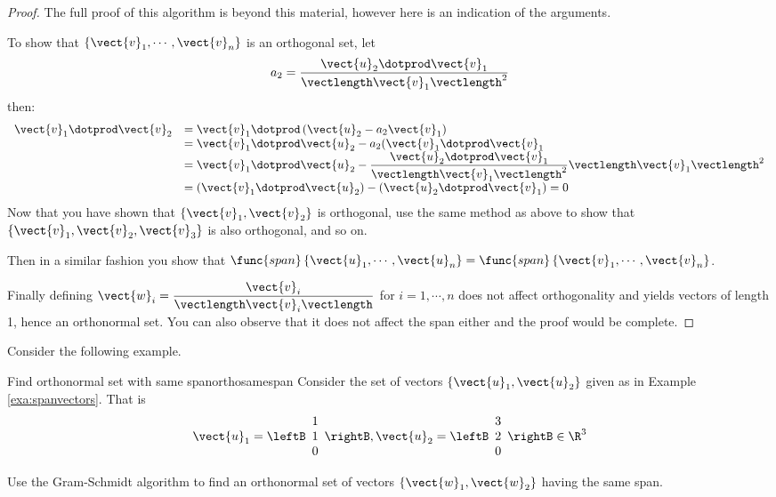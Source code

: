 \begin{proof}
The full proof of this algorithm is beyond this material, however here is an indication of the arguments. 

To show that  $\left\{ \vect{v}_1,\cdots , \vect{v}_n  \right\} $ is an orthogonal set, let 
\[ a_2 =  \dfrac{ \vect{u}_2 \dotprod \vect{v}_1}{\vectlength \vect{v}_1 \vectlength^2} \]
then: 
\[
\begin{array}{ll}
 \vect{v}_1 \dotprod \vect{v}_2 &  =  \vect{v}_1 \dotprod \left( \vect{u}_2 - a_2 \vect{v}_1 \right)  \\
 & = \vect{v}_1 \dotprod \vect{u}_2 - a_2 (\vect{v}_1 \dotprod \vect{v}_1  \\
 & = \vect{v}_1 \dotprod \vect{u}_2 - \dfrac{ \vect{u}_2 \dotprod \vect{v}_1}{\vectlength \vect{v}_1 \vectlength^2} \vectlength \vect{v}_1 \vectlength^2 \\
 & = ( \vect{v}_1 \dotprod \vect{u}_2 ) - ( \vect{u}_2 \dotprod \vect{v}_1 ) =0\\
\end{array}
\]
Now that you have shown that $\{ \vect{v}_1, \vect{v}_2\}$ is orthogonal,  use the same method as above to show that 
$\{ \vect{v}_1, \vect{v}_2, \vect{v}_3\}$ is also orthogonal,  and so on. 

Then in a similar fashion you show that $\func{span}\left\{
\vect{u}_1,\cdots ,\vect{u}_n \right\} = \func{span}\left\{
\vect{v}_1,\cdots ,\vect{v}_n \right\}$.

Finally defining $\vect{w}_i =
\dfrac{\vect{v}_i}{\vectlength\vect{v}_i\vectlength}$ for $i=1, \cdots
,n$ does not affect orthogonality and yields vectors of length 1,
hence an orthonormal set. You can also observe that it does not affect
the span either and the proof would be complete.
\end{proof}

Consider the following example.

\begin{example}{Find orthonormal set with same span}{orthosamespan}
Consider the set of vectors $\{\vect{u}_1, \vect{u}_2\}$ given as in Example \ref{exa:spanvectors}. That is  
\[
\vect{u}_1=\leftB 
\begin{array}{r}
1 \\
1 \\
0
\end{array}
\rightB, \vect{u}_2=\leftB 
\begin{array}{r}
3 \\
2 \\
0
\end{array}
\rightB \in \R^{3} 
\]

Use the Gram-Schmidt algorithm to find an orthonormal set of vectors $\{\vect{w}_1, \vect{w}_2\}$ having the same span.
\end{example}

